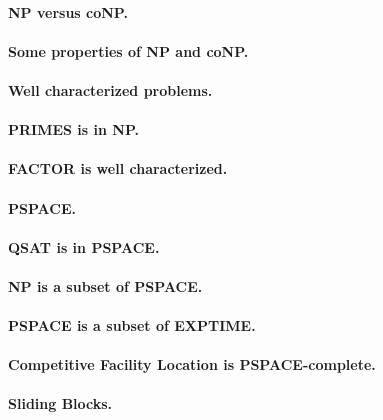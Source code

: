 \documentclass[11pt,a4paper]{article}
\theoremstyle{definition}
\begin{document}
\paragraph{NP versus coNP.}

\paragraph{Some properties of NP and coNP.}

\paragraph{Well characterized problems.}

\paragraph{PRIMES is in NP.}

\paragraph{FACTOR is well characterized.}

\paragraph{PSPACE.}

\paragraph{QSAT is in PSPACE.}

\paragraph{NP is a subset of PSPACE.}

\paragraph{PSPACE is a subset of EXPTIME.}

\paragraph{Competitive Facility Location is PSPACE-complete.}

\paragraph{Sliding Blocks.}
\end{document}
